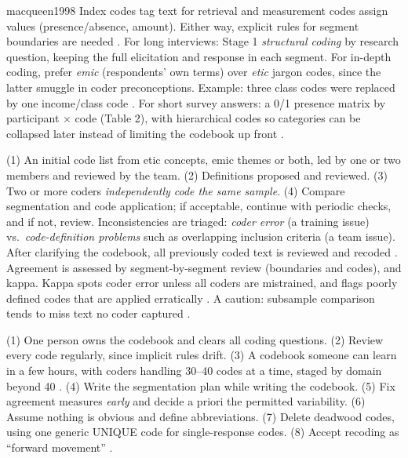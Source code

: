 \begin{papercard}{macqueen1998}
 Index codes tag text for retrieval and measurement codes assign values (presence/absence, amount). Either way, explicit rules for segment boundaries are needed . For long interviews: Stage 1 \emph{structural coding} by research question, keeping the full elicitation and response in each segment. For in-depth coding, prefer \emph{emic} (respondents' own terms) over \emph{etic} jargon codes, since the latter smuggle in coder preconceptions. Example: three class codes were replaced by one income/class code . For short survey answers: a 0/1 presence matrix by participant $\times$ code (Table 2), with hierarchical codes so categories can be collapsed later instead of limiting the codebook up front .

 (1) An initial code list from etic concepts, emic themes or both, led by one or two members and reviewed by the team. (2) Definitions proposed and reviewed. (3) Two or more coders \emph{independently code the same sample}. (4) Compare segmentation and code application; if acceptable, continue with periodic checks, and if not, review. Inconsistencies are triaged: \emph{coder error} (a training issue) vs.\ \emph{code-definition problems} such as overlapping inclusion criteria (a team issue). After clarifying the codebook, all previously coded text is reviewed and recoded . Agreement is assessed by segment-by-segment review (boundaries and codes), and kappa. Kappa spots coder error unless all coders are mistrained, and flags poorly defined codes that are applied erratically . A caution: subsample comparison tends to miss text no coder captured .

 (1) One person owns the codebook and clears all coding questions. (2) Review every code regularly, since implicit rules drift. (3) A codebook someone can learn in a few hours, with coders handling 30--40 codes at a time, staged by domain beyond 40 . (4) Write the segmentation plan while writing the codebook. (5) Fix agreement measures \emph{early} and decide a priori the permitted variability. (6) Assume nothing is obvious and define abbreviations. (7) Delete deadwood codes, using one generic UNIQUE code for single-response codes. (8) Accept recoding as ``forward movement'' .


\end{papercard}
